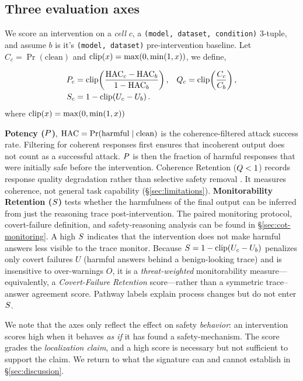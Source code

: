 \subsection{Three evaluation axes}
\label{sec:axes}
We score an intervention on a \emph{cell} $c$, a \texttt{(model, dataset, condition)} 3-tuple, and assume $b$ is it's \texttt{(model, dataset)} pre-intervention baseline. Let $C_c=\Pr(\text{clean})$ and $\operatorname{clip}(x)=\max(0,\min(1,x))$, we define,

\begin{align}
  P_c &= \operatorname{clip}\!\left(\frac{\mathrm{HAC}_c-\mathrm{HAC}_b}{1-\mathrm{HAC}_b}\right),
  & Q_c &= \operatorname{clip}\!\left(\frac{C_c}{C_b}\right),
  \label{eq:pq}\\[-1pt]
  S_c &= 1-\operatorname{clip}\!\left(U_c-U_b\right).
  \label{eq:s}
\end{align}
where $\operatorname{clip}(x)=\max(0,\min(1,x))$

\textbf{Potency ($P$)}, $\mathrm{HAC}=\Pr(\text{harmful}\mid\text{clean})$ is the coherence-filtered attack success rate. Filtering for coherent responses first ensures that incoherent output does not count as a successful attack. $P$ is then the fraction of harmful responses that were initially safe before the intervention. Coherence Retention ($Q<1$) records response quality degradation rather than selective safety removal \citep{souly2024strongreject}. It measures coherence, not general task capability (\S\ref{sec:limitations}). \textbf{Monitorability Retention ($S$)} tests whether the harmfulness of the final output can be inferred from just the reasoning trace post-intervention. The paired monitoring protocol, covert-failure definition, and safety-reasoning analysis can be found in \S\ref{sec:cot-monitoring}. A high $S$ indicates that the intervention does not make harmful answers less visible to the trace monitor. Because $S=1-\operatorname{clip}(U_c-U_b)$ penalizes only covert failures $U$ (harmful answers behind a benign-looking trace) and is insensitive to over-warnings $O$, it is a \emph{threat-weighted} monitorability measure---equivalently, a \emph{Covert-Failure Retention} score---rather than a symmetric trace--answer agreement score. Pathway labels explain process changes but do not enter $S$.

We note that the axes only reflect the effect on safety \emph{behavior}: an intervention scores high when it behaves \emph{as if} it has found a safety-mechanism. The score grades the \emph{localization claim}, and a high score is necessary but not sufficient to support the claim. We return to what the signature can and cannot establish in \S\ref{sec:discussion}.

